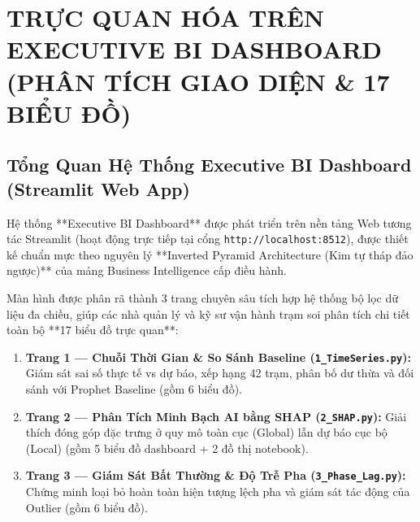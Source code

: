 \documentclass[12pt,a4paper]{article}
\begin{document}
\begin{center}
\end{center}

\section[EXECUTIVE BI DASHBOARD]{TRỰC QUAN HÓA TRÊN\\EXECUTIVE BI DASHBOARD\\(PHÂN TÍCH GIAO DIỆN \& 17 BIỂU ĐỒ)}

\subsection[Tổng Quan Executive BI Dashboard]{Tổng Quan Hệ Thống Executive BI Dashboard\\(Streamlit Web App)}
Hệ thống **Executive BI Dashboard** được phát triển trên nền tảng Web tương tác Streamlit (hoạt động trực tiếp tại cổng \texttt{http://localhost:8512}), được thiết kế chuẩn mực theo nguyên lý **Inverted Pyramid Architecture (Kim tự tháp đảo ngược)** của mảng Business Intelligence cấp điều hành.

Màn hình được phân rã thành 3 trang chuyên sâu tích hợp hệ thống bộ lọc dữ liệu đa chiều, giúp các nhà quản lý và kỹ sư vận hành trạm soi phân tích chi tiết toàn bộ **17 biểu đồ trực quan**:
\begin{enumerate}
    \item \textbf{Trang 1 — Chuỗi Thời Gian \& So Sánh Baseline (\texttt{1\_TimeSeries.py}):} Giám sát sai số thực tế vs dự báo, xếp hạng 42 trạm, phân bố dư thừa và đối sánh với Prophet Baseline (gồm 6 biểu đồ).
    \item \textbf{Trang 2 — Phân Tích Minh Bạch AI bằng SHAP (\texttt{2\_SHAP.py}):} Giải thích đóng góp đặc trưng ở quy mô toàn cục (Global) lẫn dự báo cục bộ (Local) (gồm 5 biểu đồ dashboard + 2 đồ thị notebook).
    \item \textbf{Trang 3 — Giám Sát Bất Thường \& Độ Trễ Pha (\texttt{3\_Phase\_Lag.py}):} Chứng minh loại bỏ hoàn toàn hiện tượng lệch pha và giám sát tác động của Outlier (gồm 6 biểu đồ).
\end{enumerate}
\end{document}
